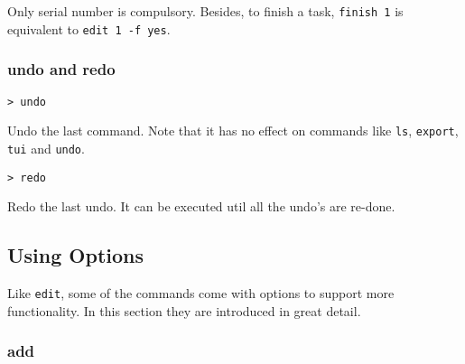 \documentclass[12pt, a4paper]{article}
\begin{document}
Only serial number is compulsory. Besides, to finish a task, \texttt{finish 1} is equivalent to \texttt{edit 1 -f yes}.


\subsubsection{undo and redo}
\texttt{\textgreater \ undo}

Undo the last command. Note that it has no effect on commands like \texttt{ls}, \texttt{export}, \texttt{tui} and \texttt{undo}.

\texttt{\textgreater \ redo}

Redo the last undo. It can be executed util all the undo's are re-done.

\subsection{Using Options}

Like \texttt{edit}, some of the commands come with options to support more functionality.
In this section they are introduced in great detail.

\subsubsection{add}
\end{document}
